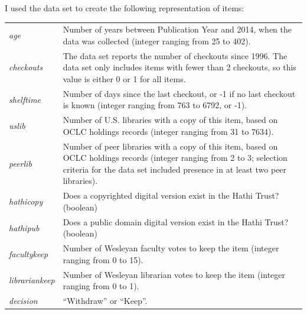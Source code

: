 \documentclass[man,11pt]{apa6}
\begin{document}
I used the data set to create the following representation of items:
\singlespacing
\begin{center}
\begin{tabular}{|l|p{4.5in}|}
\hline
 {\em age} & Number of years between Publication Year and 2014, when the
  data was collected (integer ranging from 25 to 402). \\
 {\em checkouts} & The data set reports the number of checkouts
  since 1996.  The data set only includes items with fewer than 2
  checkouts, so this value is either 0 or 1 for all items. \\
 {\em shelftime} & Number of days since the last checkout, or -1
  if no last checkout is known (integer ranging from 763 to 6792, or -1). \\
 {\em uslib} & Number of U.S. libraries with a copy of this item,
  based on OCLC holdings records (integer ranging from 31 to 7634). \\
 {\em peerlib} & Number of peer libraries with a copy of this item,
  based on OCLC holdings records (integer ranging from 2 to 3;
  selection criteria for the data set included presence in at least
  two peer libraries). \\
 {\em hathicopy} & Does a copyrighted digital version exist in the
 Hathi Trust?  (boolean)\\
 {\em hathipub} & Does a public domain digital version exist in the
 Hathi Trust?  (boolean)\\
 {\em facultykeep} & Number of Wesleyan faculty votes to keep the item
  (integer ranging from 0 to 15). \\
 {\em librariankeep} & Number of Wesleyan librarian votes to keep the
  item (integer ranging from 0 to 1). \\
\hline
 {\em decision} & ``Withdraw'' or ``Keep''. \\
\hline
\end{tabular}
\end{center}
\doublespacing
\end{document}
